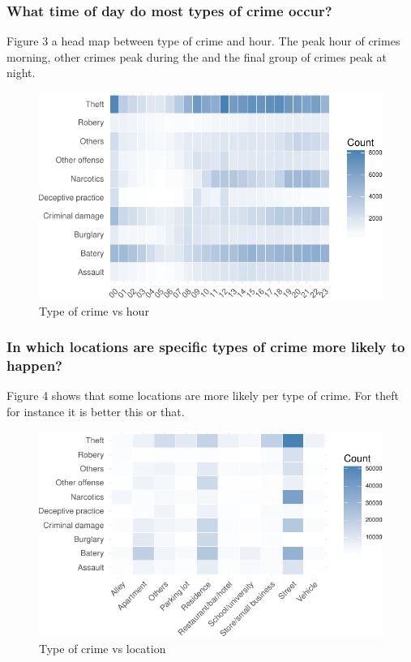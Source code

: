 \documentclass[]{article}
\begin{document}
\subsubsection{What time of day do most types of crime
occur?}\label{what-time-of-day-do-most-types-of-crime-occur}

Figure 3 a head map between type of crime and hour. The peak hour of
crimes morning, other crimes peak during the and the final group of
crimes peak at night.

\begin{figure}[H]

{\centering \includegraphics{Assessment_1v11_files/figure-latex/fig9-1} 

}

\caption{Type of crime vs hour}\label{fig:fig9}
\end{figure}

\subsubsection{In which locations are specific types of crime more
likely to
happen?}\label{in-which-locations-are-specific-types-of-crime-more-likely-to-happen}

Figure 4 shows that some locations are more likely per type of crime.
For theft for instance it is better this or that.

\begin{figure}[H]

{\centering \includegraphics{Assessment_1v11_files/figure-latex/fig11-1} 

}

\caption{Type of crime vs location}\label{fig:fig11}
\end{figure}
\end{document}
